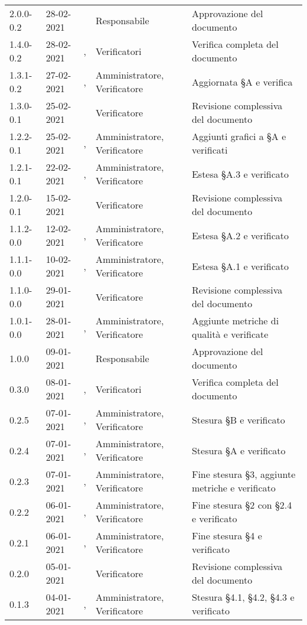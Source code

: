 {\begin{longtable}{C{1.7cm} | C{2.5cm} | C{3.2cm} | C{2.9cm} | C{4.6cm}}
2.0.0-0.2 & 28-02-2021 & \ZM{} & Responsabile & Approvazione del documento \\
1.4.0-0.2 & 28-02-2021 & \PA{}, \SH{} & Verificatori & Verifica completa del documento \\
1.3.1-0.2 & 27-02-2021 & \BM{}, \SH{} & Amministratore, Verificatore & Aggiornata \S A e verifica\\
1.3.0-0.1 & 25-02-2021 & \PA{} & Verificatore & Revisione complessiva del documento \\
1.2.2-0.1 & 25-02-2021 & \SP{}, \SH{} & Amministratore, Verificatore & Aggiunti grafici a \S A e verificati\\
1.2.1-0.1 & 22-02-2021 & \SP{}, \SH{} & Amministratore, Verificatore & Estesa \S A.3 e verificato\\
1.2.0-0.1 & 15-02-2021 & \PA{} & Verificatore & Revisione complessiva del documento \\
1.1.2-0.0 & 12-02-2021 & \BM{}, \SH{} & Amministratore, Verificatore & Estesa \S A.2 e verificato\\
1.1.1-0.0 & 10-02-2021 & \SG{}, \PA{} & Amministratore, Verificatore & Estesa \S A.1 e verificato\\
1.1.0-0.0 & 29-01-2021 & \PA{} & Verificatore & Revisione complessiva del documento \\
1.0.1-0.0 & 28-01-2021 & \BM{}, \SH{} & Amministratore, Verificatore & Aggiunte metriche di qualità e verificate\\
1.0.0 & 09-01-2021 & \BM{} & Responsabile & Approvazione del documento \\
0.3.0 & 08-01-2021 & \SP{}, \BM{} & Verificatori & Verifica completa del documento \\
0.2.5 & 07-01-2021 & \RA{}, \BM{} & Amministratore, Verificatore & Stesura \S B e verificato\\
0.2.4 & 07-01-2021 & \PA{}, \SP{} & Amministratore, Verificatore & Stesura \S A e verificato\\
0.2.3 & 07-01-2021 & \ZM{}, \BM{} & Amministratore, Verificatore & Fine stesura \S 3, aggiunte metriche e verificato\\
0.2.2 & 06-01-2021 & \PA{}, \SP{} & Amministratore, Verificatore & Fine stesura \S 2 con \S 2.4 e verificato\\
0.2.1 & 06-01-2021 & \RA{}, \BM{} & Amministratore, Verificatore & Fine stesura \S 4 e verificato\\
0.2.0 & 05-01-2021 & \BM{} & Verificatore & Revisione complessiva del documento \\
0.1.3 & 04-01-2021 & \RA{}, \SP{} & Amministratore, Verificatore & Stesura \S 4.1, \S 4.2, \S 4.3 e verificato\\

\end{longtable}}
